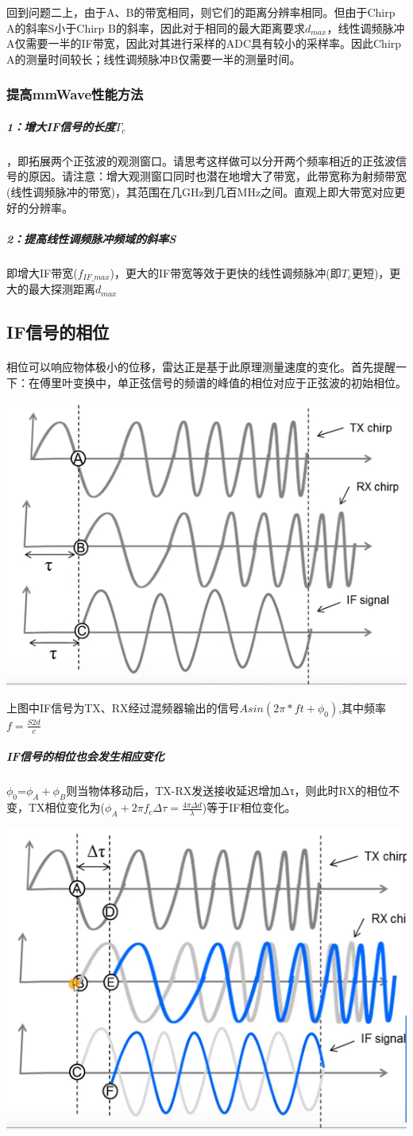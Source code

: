 \documentclass[UTF8]{ctexart}
\begin{document}
回到问题二上，由于A、B的带宽相同，则它们的距离分辨率相同。但由于Chirp A的斜率S小于Chirp B的斜率，因此对于相同的最大距离要求$d_{max}$，线性调频脉冲A仅需要一半的IF带宽，因此对其进行采样的ADC具有较小的采样率。因此Chirp A的测量时间较长；线性调频脉冲B仅需要一半的测量时间。
\subsubsection{提高mmWave性能方法}
\subparagraph{1：增大IF信号的长度$T_c$}，即拓展两个正弦波的观测窗口。请思考这样做可以分开两个频率相近的正弦波信号的原因。请注意：增大观测窗口同时也潜在地增大了带宽，此带宽称为射频带宽(线性调频脉冲的带宽)，其范围在几GHz到几百MHz之间。直观上即大带宽对应更好的分辨率。
\subparagraph{2：提高线性调频脉冲频域的斜率S}即增大IF带宽($f_{IF\_max}$)，更大的IF带宽等效于更快的线性调频脉冲(即$T_c$更短)，更大的最大探测距离$d_{max}$
\subsection{IF信号的相位}
\paragraph{}相位可以响应物体极小的位移，雷达正是基于此原理测量速度的变化。首先提醒一下：在傅里叶变换中，单正弦信号的频谱的峰值的相位对应于正弦波的初始相位。

{\centering \includegraphics[width = .4\textwidth]{pic/phaseOfIF.png}

}
上图中IF信号为TX、RX经过混频器输出的信号$Asin(2\pi*ft+\phi_0)$,其中频率$f=\frac{S2d}{c}$
\subparagraph{IF信号的相位也会发生相应变化}$\phi_0$=$\phi_A+\phi_B$则当物体移动后，TX-RX发送接收延迟增加Δτ，则此时RX的相位不变，TX相位变化为($\phi_A+2\pi f_c\Delta\tau=\frac{4\pi \Delta d}{\lambda}$)等于IF相位变化。

{\centering \includegraphics[width = .4\textwidth]{pic/phaseplustau.png}

}
\end{document}

